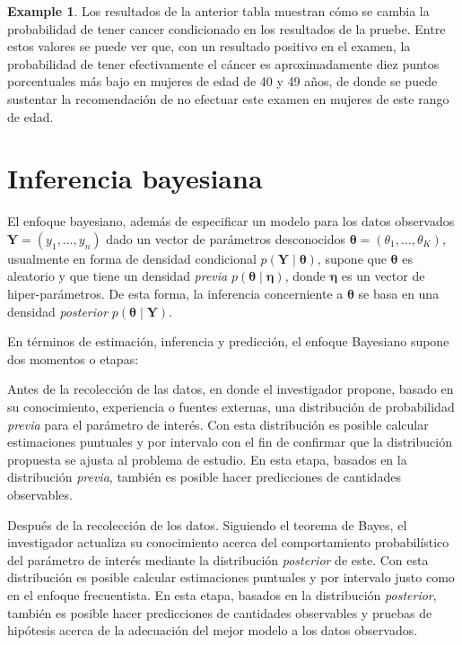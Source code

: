 \documentclass[
  spanish,
  letter]{book}
\theoremstyle{definition}
\theoremstyle{definition}
\newtheorem{example}{Example}[chapter]
\theoremstyle{definition}
\theoremstyle{remark}
\begin{document}
\begin{example}
Los resultados de la anterior tabla muestran cómo se cambia la probabilidad de tener cancer condicionado en los resultados de la pruebe. Entre estos valores se puede ver que, con un resultado positivo en el examen, la probabilidad de tener efectivamente el cáncer es aproximadamente diez puntos porcentuales más bajo en mujeres de edad de 40 y 49 años, de donde se puede sustentar la recomendación de no efectuar este examen en mujeres de este rango de edad.
\end{example}

\hypertarget{inferencia-bayesiana}{%
\section{Inferencia bayesiana}\label{inferencia-bayesiana}}

El enfoque bayesiano, además de especificar un modelo para los datos observados \(\mathbf{Y}=(y_1,\ldots,y_n)\) dado un vector de parámetros desconocidos \(\boldsymbol \theta=(\theta_1,\ldots,\theta_K)\), usualmente en forma de densidad condicional \(p(\mathbf{Y} \mid \boldsymbol \theta)\), supone que \(\boldsymbol \theta\) es aleatorio y que tiene un densidad \emph{previa} \(p(\boldsymbol \theta\mid \boldsymbol \eta)\), donde \(\boldsymbol \eta\) es un vector de hiper-parámetros. De esta forma, la inferencia concerniente a \(\boldsymbol \theta\) se basa en una densidad \emph{posterior} \(p(\boldsymbol \theta\mid \mathbf{Y})\).

En términos de estimación, inferencia y predicción, el enfoque Bayesiano supone dos momentos o etapas:

\item

Antes de la recolección de las datos, en donde el investigador propone, basado en su conocimiento, experiencia o fuentes externas, una distribución de probabilidad \emph{previa} para el parámetro de interés. Con esta distribución es posible calcular estimaciones puntuales y por intervalo con el fin de confirmar que la distribución propuesta se ajusta al problema de estudio. En esta etapa, basados en la distribución \emph{previa}, también es posible hacer predicciones de cantidades observables.

\item

Después de la recolección de los datos. Siguiendo el teorema de Bayes, el investigador actualiza su conocimiento acerca del comportamiento probabilístico del parámetro de interés mediante la distribución \emph{posterior} de este. Con esta distribución es posible calcular estimaciones puntuales y por intervalo justo como en el enfoque frecuentista. En esta etapa, basados en la distribución \emph{posterior}, también es posible hacer predicciones de cantidades observables y pruebas de hipótesis acerca de la adecuación del mejor modelo a los datos observados.
\end{document}
